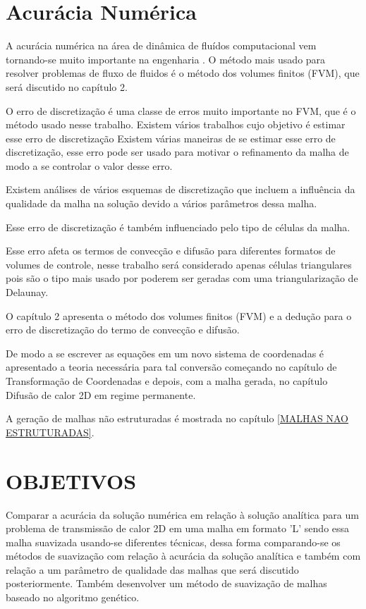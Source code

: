 \section{Acurácia Numérica}
A acurácia numérica na área de dinâmica de fluídos computacional vem tornando-se muito importante na engenharia \cite{doi:10.1080/10407791003685155}. O método mais usado para resolver problemas de fluxo de fluidos é o método dos volumes finitos (FVM), que será discutido no capítulo 2.

O erro de discretização é uma classe de erros muito importante no FVM, que é o método usado nesse trabalho. Existem vários trabalhos cujo objetivo é estimar esse erro de discretização \cite{Muzaferija2014} \cite{Jasak1996} Existem várias maneiras de se estimar esse erro de discretização, esse erro pode ser usado para motivar o refinamento da malha de modo a se controlar o valor desse erro.

Existem análises de vários esquemas de discretização que incluem a influência da qualidade da malha na solução devido a vários parâmetros dessa malha.

Esse erro de discretização é também influenciado pelo tipo de células da malha. \cite{doi:10.1080/10407791003685155}

Esse erro afeta os termos de convecção e difusão para diferentes formatos de volumes de controle, nesse trabalho será considerado apenas células triangulares pois são o tipo mais usado por poderem ser geradas com uma triangularização de Delaunay.

O capítulo 2 apresenta o método dos volumes finitos (FVM) e a dedução para o erro de discretização do termo de convecção e difusão.

De modo a se escrever as equações em um novo sistema de coordenadas é apresentado a teoria necessária para tal conversão começando no capítulo de Transformação de Coordenadas e depois, com a malha gerada, no capítulo Difusão de calor 2D em regime permanente.

A geração de malhas não estruturadas é mostrada no capítulo \ref{MALHAS NAO ESTRUTURADAS}.

\section{OBJETIVOS}

Comparar a acurácia da solução numérica em relação à solução analítica para um problema de transmissão de calor 2D em uma malha em formato 'L' sendo essa malha suavizada usando-se diferentes técnicas, dessa forma comparando-se os métodos de suavização com relação à acurácia da solução analítica e também com relação a um parâmetro de qualidade das malhas que será discutido posteriormente.
Também desenvolver um método de suavização de malhas baseado no algoritmo genético.


